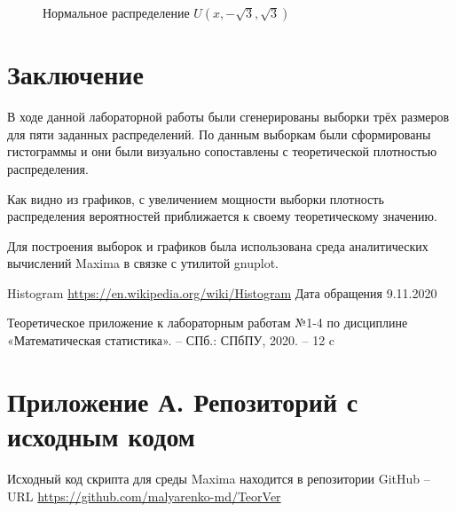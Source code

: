 \documentclass[12pt]{article}
\begin{document}
\begin{flushleft}
\begin{figure}[h!]
\begin{minipage}[h]{0.325\linewidth}
        \end{minipage}
        \caption{Нормальное распределение $U(x, -\sqrt{3}, \sqrt{3})$}
    \end{figure}

\newpage

\section*{Заключение}

В ходе данной лабораторной работы были сгенерированы выборки трёх размеров для пяти заданных распределений. По данным выборкам были сформированы гистограммы и они были визуально сопоставлены с теоретической плотностью распределения.

Как видно из графиков, с увеличением мощности выборки плотность распределения вероятностей приближается к своему теоретическому значению.

Для построения выборок и графиков была использована среда аналитических вычислений Maxima в связке с утилитой gnuplot.

\newpage


\begin{thebibliography}{9}
        Histogram \url{https://en.wikipedia.org/wiki/Histogram} Дата обращения 9.11.2020
    
        Теоретическое приложение к лабораторным работам №1-4 по дисциплине «Математическая статистика». -- СПб.: СПбПУ, 2020. -- 12 c 
	
\end{thebibliography}

\newpage

\section*{Приложение А. Репозиторий с исходным кодом}

Исходный код скрипта для среды Maxima находится в репозитории GitHub -- URL \url{https://github.com/malyarenko-md/TeorVer}

\end{flushleft}
\end{document}
